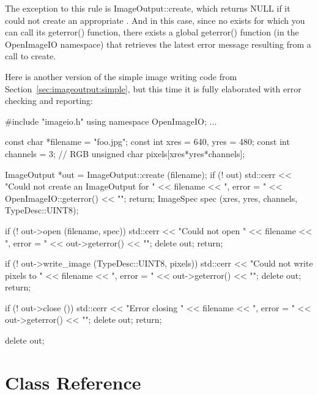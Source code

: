 The exception to this rule is {\cf ImageOutput::create}, which returns
{\cf NULL} if it could not create an appropriate \ImageOutput.  And in
this case, since no \ImageOutput exists for which you can call its {\cf
  geterror()} function, there exists a global {\cf geterror()}
function (in the {\cf OpenImageIO} namespace) that retrieves the latest
error message resulting from a call to {\cf create}.

Here is another version of the simple image writing code from
Section~\ref{sec:imageoutput:simple}, but this time it is fully 
elaborated with error checking and reporting:

\begin{code}
        #include "imageio.h"
        using namespace OpenImageIO;
        ...

        const char *filename = "foo.jpg";
        const int xres = 640, yres = 480;
        const int channels = 3;  // RGB
        unsigned char pixels[xres*yres*channels];

        ImageOutput *out = ImageOutput::create (filename);
        if (! out) {
            std::cerr << "Could not create an ImageOutput for " 
                      << filename << ", error = " 
                      << OpenImageIO::geterror() << "\n";
            return;
        }
        ImageSpec spec (xres, yres, channels, TypeDesc::UINT8);

        if (! out->open (filename, spec)) {
            std::cerr << "Could not open " << filename 
                      << ", error = " << out->geterror() << "\n";
            delete out;
            return;
        }

        if (! out->write_image (TypeDesc::UINT8, pixels)) {
            std::cerr << "Could not write pixels to " << filename 
                      << ", error = " << out->geterror() << "\n";
            delete out;
            return;
        }

        if (! out->close ()) {
            std::cerr << "Error closing " << filename 
                      << ", error = " << out->geterror() << "\n";
            delete out;
            return;
        }

        delete out;
\end{code}



\section{\ImageOutput Class Reference}
\label{sec:imageoutput:reference}

